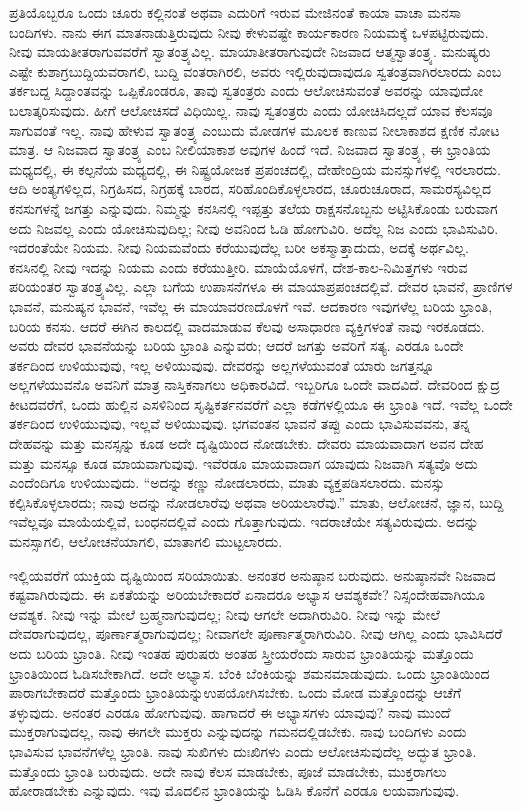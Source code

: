 ಪ್ರತಿಯೊಬ್ಬರೂ ಒಂದು ಚೂರು ಕಲ್ಲಿನಂತೆ ಅಥವಾ ಎದುರಿಗೆ ಇರುವ ಮೇಜಿನಂತೆ ಕಾಯಾ ವಾಚಾ ಮನಸಾ ಬಂದಿಗಳು. ನಾನು ಈಗ ಮಾತನಾಡುತ್ತಿರುವುದು ನೀವು ಕೇಳುವಷ್ಟೇ ಕಾರ್ಯಕಾರಣ ನಿಯಮಕ್ಕೆ ಒಳಪಟ್ಟಿರುವುದು. ನೀವು ಮಾಯತೀತರಾಗುವವರೆಗೆ ಸ್ವಾತಂತ್ರ್ಯವಿಲ್ಲ. ಮಾಯಾತೀತರಾಗುವುದೇ ನಿಜವಾದ ಆತ್ಮಸ್ವಾತಂತ್ರ್ಯ. ಮನುಷ್ಯರು ಎಷ್ಟೇ ಕುಶಾಗ್ರಬುದ್ದಿಯವರಾಗಲಿ, ಬುದ್ದಿ ವಂತರಾಗಿರಲಿ, ಅವರು ಇಲ್ಲಿರುವುದಾವುದೂ ಸ್ವತಂತ್ರವಾಗಿರಲಾರದು ಎಂಬ ತರ್ಕಬದ್ದ ಸಿದ್ದಾಂತವನ್ನು ಒಪ್ಪಿಕೊಂಡರೂ, ತಾವು ಸ್ವತಂತ್ರರು ಎಂದು ಆಲೋಚಿಸುವಂತೆ ಅವರನ್ನು ಯಾವುದೋ ಬಲಾತ್ಕರಿಸುವುದು. ಹೀಗೆ ಆಲೋಚಿಸದೆ ವಿಧಿಯಿಲ್ಲ. ನಾವು ಸ್ವತಂತ್ರರು ಎಂದು ಯೋಚಿಸಿದಲ್ಲದೆ ಯಾವ ಕೆಲಸವೂ ಸಾಗುವಂತೆ ಇಲ್ಲ. ನಾವು ಹೇಳುವ ಸ್ವಾತಂತ್ರ್ಯ ಎಂಬುದು ಮೋಡಗಳ ಮೂಲಕ ಕಾಣುವ ನೀಲಾಕಾಶದ ಕ್ಷಣಿಕ ನೋಟ ಮಾತ್ರ. ಆ ನಿಜವಾದ ಸ್ವಾತಂತ್ರ್ಯ ಎಂಬ ನೀಲಿಯಾಕಾಶ ಅವುಗಳ ಹಿಂದೆ ಇದೆ. ನಿಜವಾದ ಸ್ವಾತಂತ್ರ್ಯ, ಈ ಭ್ರಾಂತಿಯ ಮಧ್ಯದಲ್ಲಿ, ಈ ಕಲ್ಪನೆಯ ಮಧ್ಯದಲ್ಲಿ, ಈ ನಿಷ್ಟ್ರಯೋಜಕ ಪ್ರಪಂಚದಲ್ಲಿ, ದೇಹೇಂದ್ರಿಯ ಮನಸ್ಸುಗಳಲ್ಲಿ ಇರಲಾರದು. ಆದಿ ಅಂತ್ಯಗಳಿಲ್ಲದ, ನಿಗ್ರಹಿಸದ, ನಿಗ್ರಹಕ್ಕೆ ಬಾರದ, ಸರಿಹೊಂದಿಕೊಳ್ಳಲಾರದ, ಚೂರುಚೂರಾದ, ಸಾಮರಸ್ಯವಿಲ್ಲದ ಕನಸುಗಳನ್ನೆ ಜಗತ್ತು ಎನ್ನುವುದು. ನಿಮ್ಮನ್ನು ಕನಸಿನಲ್ಲಿ ಇಪ್ಪತ್ತು ತಲೆಯ ರಾಕ್ಷಸನೊಬ್ಬನು ಅಟ್ಟಿಸಿಕೊಂಡು ಬರುವಾಗ ಅದು ನಿಜವಲ್ಲ ಎಂದು ಯೋಚಿಸುವುದಿಲ್ಲ; ನೀವು ಅವನಿಂದ ಓಡಿ ಹೋಗುವಿರಿ. ಅದೆಲ್ಲ ನಿಜ ಎಂದು ಭಾವಿಸುವಿರಿ. ಇದರಂತೆಯೇ ನಿಯಮ. ನೀವು ನಿಯಮವೆಂದು ಕರೆಯುವುದೆಲ್ಲ ಬರೀ ಅಕಸ್ಮಾತ್ತಾದುದು, ಅದಕ್ಕೆ ಅರ್ಥವಿಲ್ಲ. ಕನಸಿನಲ್ಲಿ ನೀವು ಇದನ್ನು ನಿಯಮ ಎಂದು ಕರೆಯುತ್ತೀರಿ. ಮಾಯೆಯೊಳಗೆ, ದೇಶ-ಕಾಲ-ನಿಮಿತ್ತಗಳು ಇರುವ ಪರಿಯಂತರ ಸ್ವಾತಂತ್ರ್ಯವಿಲ್ಲ. ಎಲ್ಲಾ ಬಗೆಯ ಉಪಾಸನೆಗಳೂ ಈ ಮಾಯಾಪ್ರಪಂಚದಲ್ಲಿವೆ. ದೇವರ ಭಾವನೆ, ಪ್ರಾಣಿಗಳ ಭಾವನೆ, ಮನುಷ್ಯನ ಭಾವನೆ, ಇವೆಲ್ಲ ಈ ಮಾಯಾವರಣದೊಳಗೆ ಇವೆ. ಆದಕಾರಣ ಇವುಗಳೆಲ್ಲ ಬರಿಯ ಭ್ರಾಂತಿ, ಬರಿಯ ಕನಸು. ಆದರೆ ಈಗಿನ ಕಾಲದಲ್ಲಿ ವಾದಮಾಡುವ ಕೆಲವು ಅಸಾಧಾರಣ ವ್ಯಕ್ತಿಗಳಂತೆ ನಾವು ಇರಕೂಡದು. ಅವರು ದೇವರ ಭಾವನೆಯನ್ನು ಬರಿಯ ಭ್ರಾಂತಿ ಎನ್ನುವರು; ಆದರೆ ಜಗತ್ತು ಅವರಿಗೆ ಸತ್ಯ. ಎರಡೂ ಒಂದೇ ತರ್ಕದಿಂದ ಉಳಿಯುವುವು, ಇಲ್ಲ ಅಳಿಯುವುವು. ದೇವರನ್ನು ಅಲ್ಲಗಳೆಯುವಂತೆ ಯಾರು ಜಗತ್ತನ್ನೂ ಅಲ್ಲಗಳೆಯುವನೊ ಅವನಿಗೆ ಮಾತ್ರ ನಾಸ್ತಿಕನಾಗಲು ಅಧಿಕಾರವಿದೆ. ಇಬ್ಬರಿಗೂ ಒಂದೇ ವಾದವಿದೆ. ದೇವರಿಂದ ಕ್ಷುದ್ರ ಕೀಟದವರೆಗೆ, ಒಂದು ಹುಲ್ಲಿನ ಎಸಳಿನಿಂದ ಸೃಷ್ಟಿಕರ್ತನವರೆಗೆ ಎಲ್ಲಾ ಕಡೆಗಳಲ್ಲಿಯೂ ಈ ಭ್ರಾಂತಿ ಇದೆ. ಇವೆಲ್ಲ ಒಂದೇ ತರ್ಕದಿಂದ ಉಳಿಯುವುವು, ಇಲ್ಲವೆ ಅಳಿಯುವುವು. ಭಗವಂತನ ಭಾವನೆ ತಪ್ಪು ಎಂದು ಭಾವಿಸುವವನು, ತನ್ನ ದೇಹವನ್ನು ಮತ್ತು ಮನಸ್ಸನ್ನು ಕೂಡ ಅದೇ ದೃಷ್ಟಿಯಿಂದ ನೋಡಬೇಕು. ದೇವರು ಮಾಯವಾದಾಗ ಅವನ ದೇಹ ಮತ್ತು ಮನಸ್ಸೂ ಕೂಡ ಮಾಯವಾಗುವುವು. ಇವೆರಡೂ ಮಾಯವಾದಾಗ ಯಾವುದು ನಿಜವಾಗಿ ಸತ್ಯವೊ ಅದು ಎಂದೆಂದಿಗೂ ಉಳಿಯುವುದು. “ಅದನ್ನು ಕಣ್ಣು ನೋಡಲಾರದು, ಮಾತು ವ್ಯಕ್ತಪಡಿಸಲಾರದು. ಮನಸ್ಸು ಕಲ್ಪಿಸಿಕೊಳ್ಳಲಾರದು; ನಾವು ಅದನ್ನು ನೋಡಲಾರೆವು ಅಥವಾ ಅರಿಯಲಾರೆವು.'' ಮಾತು, ಆಲೋಚನೆ, ಜ್ಞಾನ, ಬುದ್ದಿ ಇವೆಲ್ಲವೂ ಮಾಯೆಯಲ್ಲಿವೆ, ಬಂಧನದಲ್ಲಿವೆ ಎಂದು ಗೊತ್ತಾಗುವುದು. ಇದರಾಚೆಯೇ ಸತ್ಯವಿರುವುದು. ಅದನ್ನು ಮನಸ್ಸಾಗಲಿ, ಆಲೋಚನೆಯಾಗಲಿ, ಮಾತಾಗಲಿ ಮುಟ್ಟಲಾರದು.

ಇಲ್ಲಿಯವರೆಗೆ ಯುಕ್ತಿಯ ದೃಷ್ಟಿಯಿಂದ ಸರಿಯಾಯಿತು. ಅನಂತರ ಅನುಷ್ಠಾನ ಬರುವುದು. ಅನುಷ್ಠಾನವೇ ನಿಜವಾದ ಕಷ್ಟವಾಗಿರುವುದು. ಈ ಏಕತೆಯನ್ನು ಅರಿಯಬೇಕಾದರೆ ಏನಾದರೂ ಅಭ್ಯಾಸ ಆವಶ್ಯಕವೇ? ನಿಸ್ಸಂದೇಹವಾಗಿಯೂ ಆವಶ್ಯಕ. ನೀವು ಇನ್ನು ಮೇಲೆ ಬ್ರಹ್ಮನಾಗುವುದಲ್ಲ; ನೀವು ಆಗಲೇ ಅದಾಗಿರುವಿರಿ. ನೀವು ಇನ್ನು ಮೇಲೆ ದೇವರಾಗುವುದಲ್ಲ, ಪೂರ್ಣಾತ್ಮರಾಗುವುದಲ್ಲ; ನೀವಾಗಲೇ ಪೂರ್ಣಾತ್ಮರಾಗಿರುವಿರಿ. ನೀವು ಆಗಿಲ್ಲ ಎಂದು ಭಾವಿಸಿದರೆ ಅದು ಬರಿಯ ಭ್ರಾಂತಿ. ನೀವು ಇಂತಹ ಪುರುಷರು ಅಂತಹ ಸ್ತ್ರೀಯರೆಂದು ಸಾರುವ ಭ್ರಾಂತಿಯನ್ನು ಮತ್ತೊಂದು ಭ್ರಾಂತಿಯಿಂದ ಓಡಿಸಬೇಕಾಗಿದೆ. ಅದೇ ಅಭ್ಯಾಸ. ಬೆಂಕಿ ಬೆಂಕಿಯನ್ನು ಶಮನಮಾಡುವುದು. ಒಂದು ಭ್ರಾಂತಿಯಿಂದ ಪಾರಾಗಬೇಕಾದರೆ ಮತ್ತೊಂದು ಭ್ರಾಂತಿಯನ್ನು\break ಉಪಯೋಗಿಸಬೇಕು. ಒಂದು ಮೋಡ ಮತ್ತೊಂದನ್ನು ಆಚೆಗೆ ತಳ್ಳುವುದು. ಅನಂತರ ಎರಡೂ ಹೋಗುವುವು. ಹಾಗಾದರೆ ಈ ಅಭ್ಯಾಸಗಳು ಯಾವುವು? ನಾವು ಮುಂದೆ ಮುಕ್ತರಾಗುವುದಲ್ಲ, ನಾವು ಈಗಲೇ ಮುಕ್ತರು ಎನ್ನುವುದನ್ನು ಗಮನದಲ್ಲಿಡಬೇಕು. ನಾವು ಬಂದಿಗಳು ಎಂದು ಭಾವಿಸುವ ಭಾವನೆಗಳೆಲ್ಲ ಭ್ರಾಂತಿ. ನಾವು ಸುಖಿಗಳು ದುಃಖಿಗಳು ಎಂದು ಆಲೋಚಿಸುವುದೆಲ್ಲ ಅದ್ಭುತ ಭ್ರಾಂತಿ. ಮತ್ತೊಂದು ಭ್ರಾಂತಿ ಬರುವುದು. ಅದೇ ನಾವು ಕೆಲಸ ಮಾಡಬೇಕು, ಪೂಜೆ ಮಾಡಬೇಕು, ಮುಕ್ತರಾಗಲು ಹೋರಾಡಬೇಕು ಎನ್ನುವುದು. ಇವು ಮೊದಲಿನ ಭ್ರಾಂತಿಯನ್ನು ಓಡಿಸಿ ಕೊನೆಗೆ ಎರಡೂ ಲಯವಾಗುವುವು.

